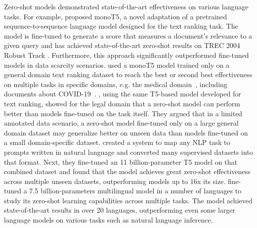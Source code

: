 \documentclass[sigconf,nonacm]{acmart}
\begin{document}
Zero-shot models demonstrated state-of-the-art effectiveness on various language tasks. For example, \citet{nogueira2020document} proposed monoT5, a novel adaptation of a pretrained sequence-to-sequence language model designed for the text ranking task. The model is fine-tuned to generate a score that measures a document's relevance to a given query and has achieved state-of-the-art zero-shot results on TREC 2004 Robust Track \cite{trec2004}. Furthermore, this approach significantly outperformed fine-tuned models in data scarcity scenarios. \citet{pradeep5h2oloo} used a monoT5 model trained only on a general domain text ranking dataset to reach the best or second best effectiveness on multiple tasks in specific domains, e.g. the medical domain~\cite{Roberts2019OverviewOT}, including documents about COVID-19~\cite{zhang2020rapidly}. \citet{icail_2021}, using the same T5-based model developed for text ranking, showed for the legal domain that a zero-shot model can perform better than models fine-tuned on the task itself. They argued that in a limited annotated data scenario, a zero-shot model fine-tuned only on a large general domain dataset may generalize better on unseen data than models fine-tuned on a small domain-specific dataset. \citet{sahn_2021} created a system to map any NLP task to prompts written in natural language and converted many supervised datasets into that format. Next, they fine-tuned an 11 billion-parameter T5 model on that combined dataset and found that the model achieves great zero-shot effectiveness across multiple unseen datasets, outperforming models up to 16x its size. \citet{lin_2021} fine-tuned a 7.5 billion-parameters multilingual model in a number of languages to study its zero-shot learning capabilities across multiple tasks. The model achieved state-of-the-art results in over 20 languages, outperforming even some larger language models on various tasks such as natural language inference. 
\end{document}
